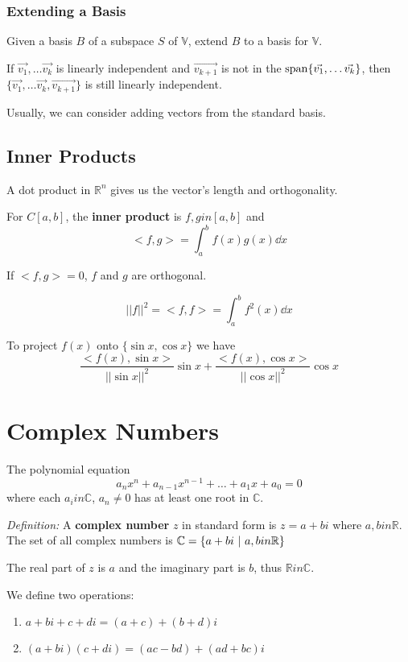 \documentclass[12pt]{article}
\newcommand{\R}[1]{\mathbb{R}^{#1}}
\newcommand{\spanv}[1]{{\rm span}\{#1\}}
\begin{document}
\subsubsection*{Extending a Basis}
Given a basis $B$ of a subspace $S$ of $\mathbb{V}$, extend $B$ to a basis for $\mathbb{V}$.

\begin{theorem}
If $\vec{v_1},\dots \vec{v_k}$ is linearly independent and $\vec{v_{k+1}}$ is not in the $\spanv{\vec{v_1},\dots \vec{v_k}}$, then $\{\vec{v_1},\dots \vec{v_k}, \vec{v_{k+1}}\}$ is still linearly independent.
\end{theorem}

Usually, we can consider adding vectors from the standard basis.

\subsection*{Inner Products}
A dot product in $\R{n}$ gives us the vector's length and orthogonality.

For $C[a,b]$, the {\bf inner product} is $f, g in [a,b]$ and \[ <f,g> = \int_a^b f(x)g(x) \dd x \]

If $<f,g> = 0$, $f$ and $g$ are orthogonal.

\[ {||f||}^2 = <f,f> = \int_a^b f^2(x) \dd x \]

To project $f(x)$ onto $\{\sin x,\cos x\}$ we have \[ \frac{<f(x),\sin x>}{{||\sin x||}^2}\sin x + \frac{<f(x),\cos x>}{{||\cos x||}^2}\cos x \]

\section*{Complex Numbers}
\begin{theorem}
The polynomial equation \[ a_nx^n + a_{n-1}x^{n-1} + \dots + a_1x + a_0 = 0  \] where each $a_i in \mathbb{C}$, $a_n \neq 0$ has at least one root in $\mathbb{C}$.
\end{theorem}

\textit{Definition:} A {\bf complex number} $z$ in standard form is $z = a + bi$ where $a, b in \mathbb{R}$. The set of all complex numbers is $\mathbb{C} = \{a + bi \ |\  a, b in \mathbb{R}\}$

The real part of $z$ is $a$ and the imaginary part is $b$, thus $\mathbb{R} in \mathbb{C}$.

We define two operations:
\begin{enumerate}
\item $a + bi + c + di = (a + c) + (b + d)i$
\item $(a + bi)(c + di) = (ac - bd) + (ad + bc)i$
\end{enumerate}
\end{document}
